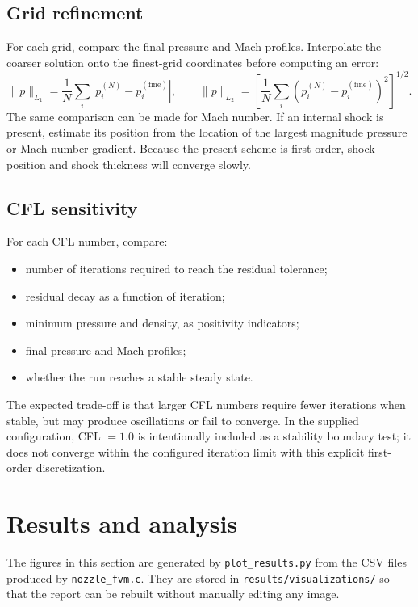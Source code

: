 \documentclass[11pt,a4paper]{article}
\begin{document}
\subsection{Grid refinement}
For each grid, compare the final pressure and Mach profiles. Interpolate the
coarser solution onto the finest-grid coordinates before computing an error:
\begin{equation}
  \|p\|_{L_1} = \frac{1}{N}\sum_i |p_i^{(N)}-p_i^{(\mathrm{fine})}|,
  \qquad
  \|p\|_{L_2} =
  \left[\frac{1}{N}\sum_i
  \left(p_i^{(N)}-p_i^{(\mathrm{fine})}\right)^2\right]^{1/2}.
\end{equation}
The same comparison can be made for Mach number. If an internal shock is
present, estimate its position from the location of the largest magnitude
pressure or Mach-number gradient. Because the present scheme is first-order,
shock position and shock thickness will converge slowly.

\subsection{CFL sensitivity}
For each CFL number, compare:
\begin{itemize}
  \item number of iterations required to reach the residual tolerance;
  \item residual decay as a function of iteration;
  \item minimum pressure and density, as positivity indicators;
  \item final pressure and Mach profiles;
  \item whether the run reaches a stable steady state.
\end{itemize}
The expected trade-off is that larger CFL numbers require fewer iterations when
stable, but may produce oscillations or fail to converge. In the supplied
configuration, CFL $=1.0$ is intentionally included as a stability boundary
test; it does not converge within the configured iteration limit with this
explicit first-order discretization.

\section{Results and analysis}
The figures in this section are generated by \texttt{plot\_results.py} from the
CSV files produced by \texttt{nozzle\_fvm.c}. They are stored in
\texttt{results/visualizations/} so that the report can be rebuilt without
manually editing any image.
\end{document}
